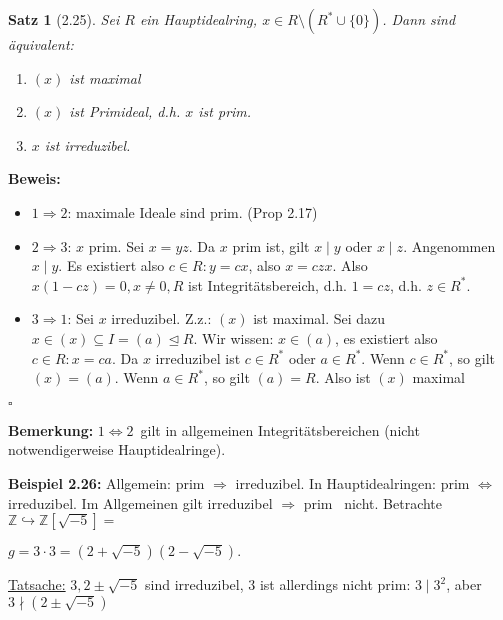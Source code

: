 \documentclass[10pt,a4paper]{article}
\newtheorem{satz}{Satz}
\begin{document}
\begin{satz}[2.25]
Sei $R$ ein Hauptidealring, $x \in R \setminus (R^* \cup \{0\})$. Dann sind äquivalent:\begin{enumerate}
\item $(x)$ ist maximal
\item $(x)$ ist Primideal, d.h. $x$ ist prim.
\item $x$ ist irreduzibel.
\end{enumerate}
\end{satz}
\textbf{Beweis:} \begin{itemize}
\item \glqq $1 \Rightarrow 2$\grqq : maximale Ideale sind prim. (Prop 2.17)
\item \glqq $2 \Rightarrow 3$\grqq : $x$ prim. Sei $x = yz$. Da $x$ prim ist, gilt $x \mid y$ oder $x \mid z$. Angenommen $x \mid y$. Es existiert also $c \in R: y = cx$, also $x = czx$. Also $x(1-cz) = 0, x \neq 0, R$ ist Integritätsbereich, d.h. $1 = cz$, d.h. $z \in R^*$.
\item \glqq $3 \Rightarrow 1$\grqq : Sei $x$ irreduzibel. Z.z.: $(x)$ ist maximal. Sei dazu $x \in (x) \subseteq I = (a) \trianglelefteq R$. Wir wissen: $x \in (a)$, es existiert also $c \in R: x = ca$. Da $x$ irreduzibel ist $c \in R^*$ oder $a \in R^*$. Wenn $c \in R^*$, so gilt $(x) = (a)$. Wenn $a \in R^*$, so gilt $(a) = R$. Also ist $(x)$ maximal 
\end{itemize} $\square$

\textbf{Bemerkung:} \glqq $1 \Leftrightarrow 2$\grqq\ gilt in allgemeinen Integritätsbereichen (nicht notwendigerweise Hauptidealringe).\bigskip

\textbf{Beispiel 2.26:} Allgemein: \glqq prim $\Rightarrow$ irreduzibel\grqq . In Hauptidealringen: \glqq prim $\Leftrightarrow$ irreduzibel\grqq . Im Allgemeinen gilt \glqq irreduzibel $\Rightarrow$ prim \grqq\ nicht. Betrachte $\mathbb{Z} \hookrightarrow \mathbb{Z}[\sqrt{-5}] = $ 

$g = 3 \cdot 3 = (2 + \sqrt{-5}) (2 - \sqrt{-5}).$ 

\underline{Tatsache:} $3, 2 \pm \sqrt{-5}$ sind irreduzibel, $3$ ist allerdings nicht prim: $3 \mid 3^2$, aber $3 \nmid (2 \pm \sqrt{-5})$
\end{document}
